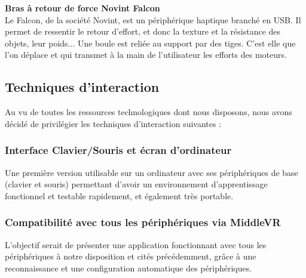 \textbf{Bras à retour de force Novint Falcon}
\\

Le Falcon, de la société Novint, est un périphérique haptique branché en USB. Il permet de ressentir le retour d'effort, et donc la texture et la résistance des objets, leur poids... Une boule est reliée au support par des tiges. C'est elle que l'on déplace et qui transmet à la main de l'utilisateur les efforts des moteurs.
\\

\subsection{Techniques d'interaction}
Au vu de toutes les ressources technologiques dont nous disposons, nous avons décidé de privilégier les techniques d'interaction suivantes :

\subsubsection{Interface Clavier/Souris et écran d'ordinateur}
Une première version utilisable sur un ordinateur avec ses périphériques de base (clavier et souris) permettant d'avoir un environnement d'apprentissage fonctionnel et testable rapidement, et également très portable.

\subsubsection{Compatibilité avec tous les périphériques via MiddleVR}
L'objectif serait de présenter une application fonctionnant avec tous les périphériques à notre disposition et cités précédemment, grâce à une reconnaissance et une configuration automatique des périphériques.
\\
